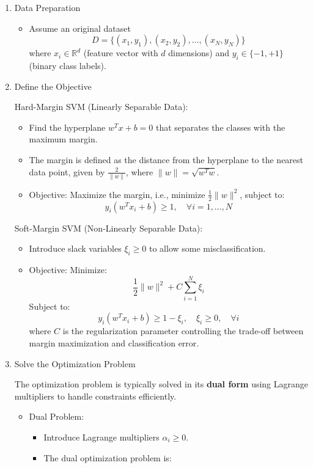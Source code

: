 \begin{enumerate}[label=Step \arabic*:, align=left, leftmargin=20pt,labelsep=1em]
    \item Data Preparation
    \begin{itemize}
        \item Assume an original dataset
        \[D = \{ (x_1, y_1), (x_2, y_2), \dots, (x_N, y_N) \}\]
        where $x_i \in \mathbb{R}^d$ (feature vector with $d$ dimensions) and $y_i \in \{-1, +1\}$ (binary class labels).
    \end{itemize}

    \item Define the Objective

    \smallskip
    Hard-Margin SVM (Linearly Separable Data):
    \begin{itemize}
        \item Find the hyperplane $w^T x + b = 0$ that separates the classes with the maximum margin.
        \item The margin is defined as the distance from the hyperplane to the nearest data point, given by $\frac{2}{\|w\|}$, where $\|w\| = \sqrt{w^T w}$.
        \item Objective: Maximize the margin, i.e., minimize $\frac{1}{2} \|w\|^2$, subject to:
        \[y_i (w^T x_i + b) \geq 1, \quad \forall i = 1, \dots, N\]
    \end{itemize}

    \smallskip
    Soft-Margin SVM (Non-Linearly Separable Data):
    \begin{itemize}
        \item Introduce slack variables $\xi_i \geq 0$ to allow some misclassification.
        \item Objective: Minimize:
        \[\frac{1}{2} \|w\|^2 + C \sum_{i=1}^N \xi_i\]
        Subject to:
        \[y_i (w^T x_i + b) \geq 1 - \xi_i, \quad \xi_i \geq 0, \quad \forall i\]
        where $C$ is the regularization parameter controlling the trade-off between margin maximization and classification error.
    \end{itemize}

    \item Solve the Optimization Problem

    \smallskip
    The optimization problem is typically solved in its \textbf{dual form} using Lagrange multipliers to handle constraints efficiently.
    \begin{itemize}
        \item Dual Problem:
        \begin{itemize}
            \item Introduce Lagrange multipliers $\alpha_i \geq 0$.
            \item The dual optimization problem is:
        \end{itemize}


\end{itemize}
\end{enumerate}
